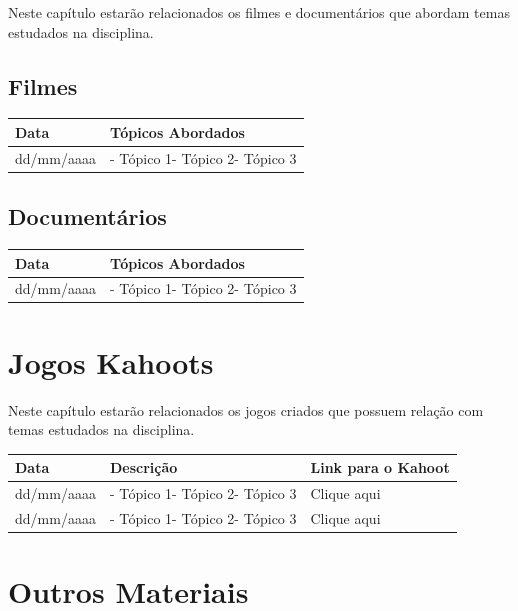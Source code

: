 \documentclass[
]{book}
\begin{document}
Neste capítulo estarão relacionados os filmes e documentários que abordam temas estudados na disciplina.

\hypertarget{filmes}{%
\section{Filmes}\label{filmes}}

\begin{longtable}[]{@{}ll@{}}
\toprule()
Data & Tópicos Abordados \\
\midrule()
\endhead
dd/mm/aaaa & - Tópico 1- Tópico 2- Tópico 3 \\
\bottomrule()
\end{longtable}

\hypertarget{documentuxe1rios}{%
\section{Documentários}\label{documentuxe1rios}}

\begin{longtable}[]{@{}ll@{}}
\toprule()
Data & Tópicos Abordados \\
\midrule()
\endhead
dd/mm/aaaa & - Tópico 1- Tópico 2- Tópico 3 \\
\bottomrule()
\end{longtable}

\hypertarget{jogos-kahoots}{%
\chapter{Jogos Kahoots}\label{jogos-kahoots}}

Neste capítulo estarão relacionados os jogos criados que possuem relação com temas estudados na disciplina.

\begin{longtable}[]{@{}lll@{}}
\toprule()
Data & Descrição & Link para o Kahoot \\
\midrule()
\endhead
dd/mm/aaaa & - Tópico 1- Tópico 2- Tópico 3 & Clique aqui \\
dd/mm/aaaa & - Tópico 1- Tópico 2- Tópico 3 & Clique aqui \\
\bottomrule()
\end{longtable}

\hypertarget{outros-materiais}{%
\chapter{Outros Materiais}\label{outros-materiais}}
\end{document}
